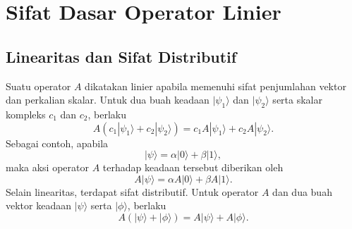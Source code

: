 \section{Sifat Dasar Operator Linier}

\subsection{Linearitas dan Sifat Distributif}
Suatu operator $A$ dikatakan linier apabila memenuhi sifat penjumlahan vektor dan perkalian skalar. Untuk dua buah keadaan $|\psi_1\rangle$ dan $|\psi_2\rangle$ serta skalar kompleks $c_1$ dan $c_2$, berlaku
\begin{equation}
\label{eq:linearity_operator}
    A
    \left(
    c_1 |\psi_1\rangle
    +
    c_2 |\psi_2\rangle
    \right)
    =
    c_1 A|\psi_1\rangle
    +
    c_2 A|\psi_2\rangle.
\end{equation}
Sebagai contoh, apabila
\begin{equation}
    |\psi\rangle
    =
    \alpha |0\rangle
    +
    \beta |1\rangle,
\end{equation}
maka aksi operator $A$ terhadap keadaan tersebut diberikan oleh
\begin{equation}
    A|\psi\rangle
    =
    \alpha A|0\rangle
    +
    \beta A|1\rangle.
\end{equation}
Selain linearitas, terdapat sifat distributif. Untuk operator $A$ dan dua buah vektor keadaan $|\psi\rangle$ serta $|\phi\rangle$, berlaku
\begin{equation}
\label{eq:distributive_property}
    A
    \left(
    |\psi\rangle
    +
    |\phi\rangle
    \right)
    =
    A|\psi\rangle
    +
    A|\phi\rangle.
\end{equation}

